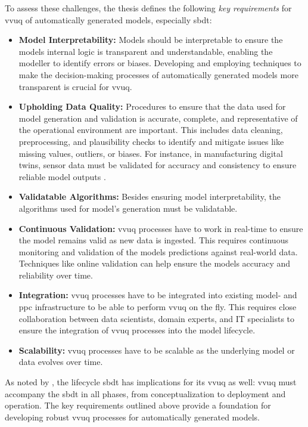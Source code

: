To assess these challenges, the thesis defines the following \textit{key requirements} for \gls{vvuq} of automatically generated models, especially \gls{sbdt}:
\begin{itemize}
    \label{par:key-requirements}
    \item \textbf{Model Interpretability:} \label{par:surrogate} Models should be interpretable to ensure the models internal logic is transparent and understandable, enabling the modeller to identify errors or biases. Developing and employing techniques to make the decision-making processes of automatically generated models more transparent is crucial for \gls{vvuq}.
    \item \textbf{Upholding Data Quality:} Procedures to ensure that the data used for model generation and validation is accurate, complete, and representative of the operational environment are important. This includes data cleaning, preprocessing, and plausibility checks to identify and mitigate issues like missing values, outliers, or biases. For instance, in manufacturing digital twins, sensor data must be validated for accuracy and consistency to ensure reliable model outputs \autocite{rodriguez2023updating}.
    \item \textbf{Validatable Algorithms:} Besides ensuring model interpretability, the algorithms used for model's generation must be validatable.
    \item \textbf{Continuous Validation:} \gls{vvuq} processes have to work in real-time to ensure the model remains valid as new data is ingested. This requires continuous monitoring and validation of the models predictions against real-world data. Techniques like online validation \autocite{francis2021towards} can help ensure the models accuracy and reliability over time.
    \item \textbf{Integration:} \gls{vvuq} processes have to be integrated into existing model- and \gls{ppc} infrastructure to be able to perform \gls{vvuq} on the fly. This requires close collaboration between data scientists, domain experts, and IT specialists to ensure the integration of \gls{vvuq} processes into the model lifecycle.
    \item \textbf{Scalability:} \gls{vvuq} processes have to be scalable as the underlying model or data evolves over time.
\end{itemize}

As noted by \textcite{francis2021towards}, the lifecycle \gls{sbdt} has implications for its \gls{vvuq} as well: \gls{vvuq} must accompany the \gls{sbdt} in all phases, from conceptualization to deployment and operation. The key requirements outlined above provide a foundation for developing robust \gls{vvuq} processes for automatically generated models.


